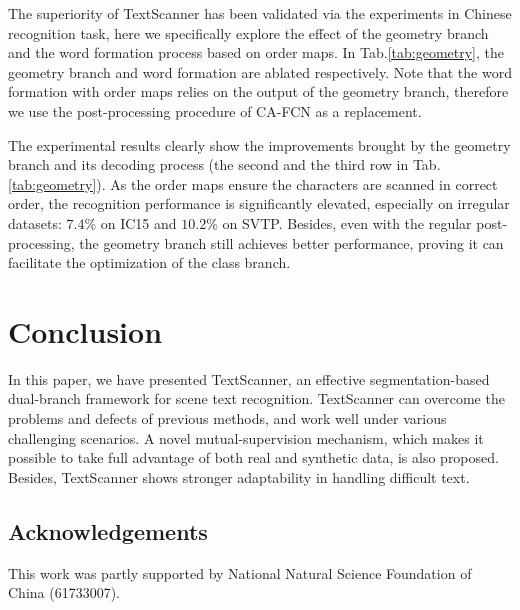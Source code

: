 \documentclass[letterpaper]{article} \usepackage{aaai20}  \usepackage{times}  \usepackage{helvet} \usepackage{courier}  \usepackage[hyphens]{url}  \usepackage{graphicx} \urlstyle{rm} \def\UrlFont{\rm}  \usepackage{graphicx}  \frenchspacing  \setlength{\pdfpagewidth}{8.5in}  \setlength{\pdfpageheight}{11in}
\begin{document}
\begin{table}[ht]
    \centering
    \caption{Recognition performance with different settings. ``Geo'' denotes the geometry branch, ``Ord'' denotes word formation using the order maps.}
    \label{tab:geometry}
\end{table}


The superiority of TextScanner has been validated via the experiments in Chinese recognition task, here we specifically explore the effect of the geometry branch and the word formation process based on order maps. In Tab.\ref{tab:geometry}, the geometry branch and word formation are ablated respectively. Note that the word formation with order maps relies on the output of the geometry branch, therefore we use the post-processing procedure of CA-FCN as a replacement.

The experimental results clearly show the improvements brought by the geometry branch and its decoding process (the second and the third row in Tab.\ref{tab:geometry}). As the order maps ensure the characters are scanned in correct order, the recognition performance is significantly elevated, especially on irregular datasets: $7.4\%$ on IC15 and $10.2\%$ on SVTP. Besides, even with the regular post-processing, the geometry branch still achieves better performance, proving it can facilitate the optimization of the class branch.

\section{Conclusion}

In this paper, we have presented TextScanner, an effective segmentation-based dual-branch framework for scene text recognition. TextScanner can overcome the problems and defects of previous methods, and work well under various challenging scenarios. A novel mutual-supervision mechanism, which makes it possible to take full advantage of both real and synthetic data, is also proposed. Besides, TextScanner shows stronger adaptability in handling difficult text.
\subsection*{Acknowledgements}
This work was partly supported by National Natural Science
Foundation of China (61733007).

{\fontsize{9.0pt}{10.0pt} \selectfont


}
\end{document}

